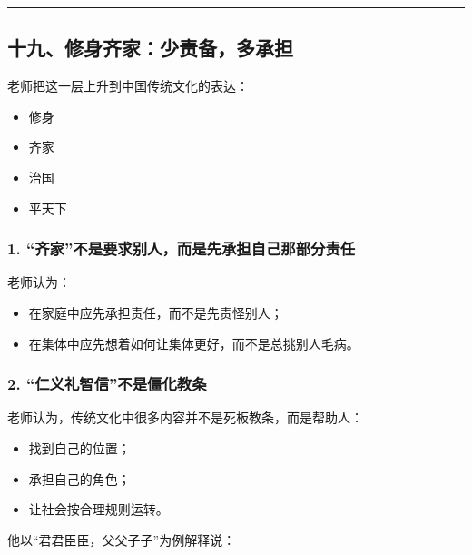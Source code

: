 \documentclass[
  chinese,
  9pt,
  a4paper,
]{ctexart}
\providecommand{\tightlist}{%
  \setlength{\itemsep}{0pt}\setlength{\parskip}{0pt}}
\begin{document}
\begin{center}\rule{0.5\linewidth}{0.5pt}\end{center}

\subsection{十九、修身齐家：少责备，多承担}\label{ux5341ux4e5dux4feeux8eabux9f50ux5bb6ux5c11ux8d23ux5907ux591aux627fux62c5}

老师把这一层上升到中国传统文化的表达：

\begin{itemize}
\tightlist
\item
  修身
\item
  齐家
\item
  治国
\item
  平天下
\end{itemize}

\subsubsection{1.
``齐家''不是要求别人，而是先承担自己那部分责任}\label{ux9f50ux5bb6ux4e0dux662fux8981ux6c42ux522bux4ebaux800cux662fux5148ux627fux62c5ux81eaux5df1ux90a3ux90e8ux5206ux8d23ux4efb}

老师认为：

\begin{itemize}
\tightlist
\item
  在家庭中应先承担责任，而不是先责怪别人；
\item
  在集体中应先想着如何让集体更好，而不是总挑别人毛病。
\end{itemize}

\subsubsection{2.
``仁义礼智信''不是僵化教条}\label{ux4ec1ux4e49ux793cux667aux4fe1ux4e0dux662fux50f5ux5316ux6559ux6761}

老师认为，传统文化中很多内容并不是死板教条，而是帮助人：

\begin{itemize}
\tightlist
\item
  找到自己的位置；
\item
  承担自己的角色；
\item
  让社会按合理规则运转。
\end{itemize}

他以``君君臣臣，父父子子''为例解释说：
\end{document}
